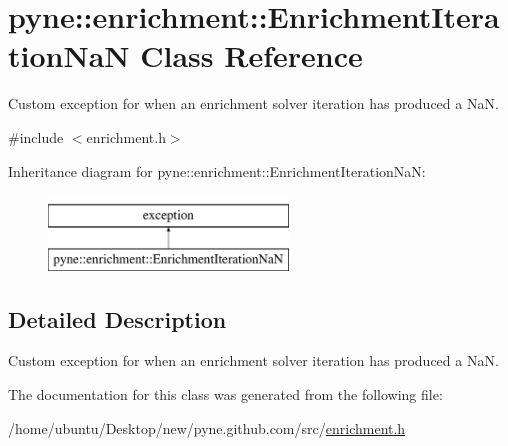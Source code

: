 \hypertarget{classpyne_1_1enrichment_1_1_enrichment_iteration_na_n}{}\section{pyne\+:\+:enrichment\+:\+:Enrichment\+Iteration\+NaN Class Reference}
\label{classpyne_1_1enrichment_1_1_enrichment_iteration_na_n}


Custom exception for when an enrichment solver iteration has produced a NaN.  




{\ttfamily \#include $<$enrichment.\+h$>$}

Inheritance diagram for pyne\+:\+:enrichment\+:\+:Enrichment\+Iteration\+NaN\+:\begin{figure}[H]
\begin{center}
\leavevmode
\includegraphics[height=2.000000cm]{classpyne_1_1enrichment_1_1_enrichment_iteration_na_n}
\end{center}
\end{figure}


\subsection{Detailed Description}
Custom exception for when an enrichment solver iteration has produced a NaN. 

The documentation for this class was generated from the following file\+:\begin{DoxyCompactItemize}
\item 
/home/ubuntu/\+Desktop/new/pyne.\+github.\+com/src/\hyperlink{enrichment_8h}{enrichment.\+h}\end{DoxyCompactItemize}
